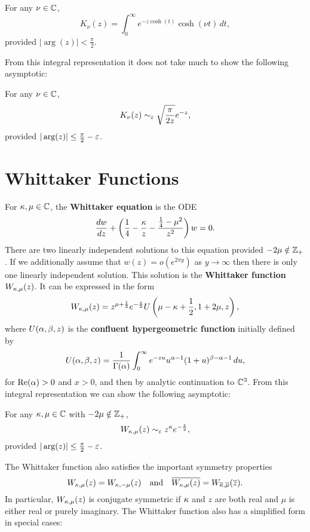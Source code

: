     \begin{proposition}\label{prop:integral_representation_K-Bessel_function}
      For any $\nu \in \mathbb{C}$,
      \[
        K_{\nu}(z) = \int_{0}^{\infty}e^{-z\cosh(t)}\cosh(\nu t)\,dt,
      \]
      provided $|\arg(z)| < \frac{\pi}{2}$.
    \end{proposition}

    From this integral representation it does not take much to show the following asymptotic:

    \begin{lemma}\label{lem:K_Bessel_function_asymptotic}
      For any $\nu \in \mathbb{C}$,
      \[
        K_{\nu}(z) \sim_{\varepsilon} \sqrt{\frac{\pi}{2z}}e^{-z},
      \]
      provided $|\arg(z)| \le \frac{\pi}{2}-\varepsilon$.
    \end{lemma}
  \section{Whittaker Functions}\label{append:Whittaker_Functions}
    For $\kappa,\mu \in \mathbb{C}$, the \textbf{Whittaker equation} is the ODE
    \[
      \frac{dw}{dz}+\left(\frac{1}{4}-\frac{\kappa}{z}-\frac{\frac{1}{4}-\mu^{2}}{z^{2}}\right)w = 0.
    \]
    There are two linearly independent solutions to this equation provided $-2\mu \notin \mathbb{Z}_{+}$. If we additionally assume that $w(z) = o(e^{2\pi y})$ as $y \to \infty$ then there is only one linearly independent solution. This solution is the \textbf{Whittaker function} $W_{\kappa,\mu}(z)$. It can be expressed in the form
    \[
      W_{\kappa,\mu}(z) = z^{\mu+\frac{1}{2}}e^{-\frac{z}{2}}U\left(\mu-\kappa+\frac{1}{2},1+2\mu,z\right),
    \]
    where $U(\alpha,\beta,z)$ is the \textbf{confluent hypergeometric function} initially defined by
    \[
      U(\alpha,\beta,z) = \frac{1}{\Gamma(\alpha)}\int_{0}^{\infty}e^{-zu}u^{\alpha-1}(1+u)^{\beta-\alpha-1}\,du,
    \]
    for $\mathrm{Re}(\alpha) > 0$ and $x > 0$, and then by analytic continuation to $\mathbb{C}^{3}$. From this integral representation we can show the following asymptotic:

    \begin{lemma}\label{lem:Whittaker_function_asymptotic}
      For any $\kappa,\mu \in \mathbb{C}$ with $-2\mu \notin \mathbb{Z}_{+}$,
      \[
        W_{\kappa,\mu}(z) \sim_{\varepsilon} z^{\kappa}e^{-\frac{z}{2}},
      \]
      provided $|\arg(z)| \le \frac{\pi}{2}-\varepsilon$.
    \end{lemma}

    The Whittaker function also satisfies the important symmetry properties
    \[
      W_{\kappa,\mu}(z) = W_{\kappa,-\mu}(z) \quad \text{and} \quad \overline{W_{\kappa,\mu}(z)} = W_{\overline{\kappa},\overline{\mu}}(\overline{z}).
    \]
    In particular, $W_{\kappa,\mu}(z)$ is conjugate symmetric if $\kappa$ and $z$ are both real and $\mu$ is either real or purely imaginary. The Whittaker function also has a simplified form in special cases:
    

